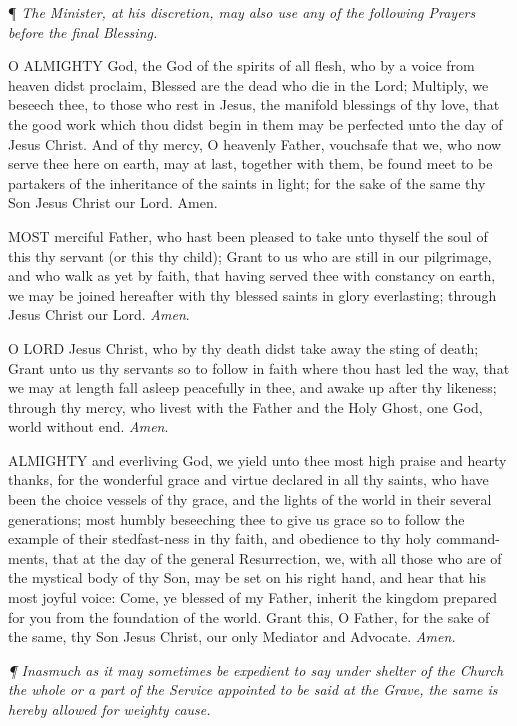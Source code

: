 ¶
\emph{The Minister, at his discretion, may also use any of the following
Prayers before the final Blessing.}

O
ALMIGHTY God, the God of the spirits of all flesh, who by a voice from
heaven didst proclaim, Blessed are the dead who die in the Lord; Multiply,
we beseech thee, to those who rest in Jesus, the manifold blessings of
thy love, that the good work which thou didst begin in them may be perfected
unto the day of Jesus Christ. And of thy mercy, O heavenly Father, vouchsafe
that we, who now serve thee here on earth, may at last, together with
them, be found meet to be partakers of the inheritance of the saints in
light; for the sake of the same thy Son Jesus Christ our Lord. Amen.

MOST
merciful Father, who hast been pleased to take unto thyself the soul of
this thy servant (or this thy child); Grant to us who are still in our
pilgrimage, and who walk as yet by faith, that having served thee with
constancy on earth, we may be joined hereafter with thy blessed saints
in glory everlasting; through Jesus Christ our Lord. \emph{Amen}.

O
LORD Jesus Christ, who by thy death didst take away the sting of death;
Grant unto us thy servants so to follow in faith where thou hast led the
way, that we may at length fall asleep peacefully in thee, and awake up
after thy likeness; through thy mercy, who livest with the Father and
the Holy Ghost, one God, world without end. \emph{Amen}.

ALMIGHTY
and everliving God, we yield unto thee most high praise and hearty thanks,
for the wonderful grace and virtue declared in all thy saints, who have
been the choice vessels of thy grace, and the lights of the world in their
several generations; most humbly beseeching thee to give us grace so to
follow the example of their stedfast-ness in thy faith, and obedience
to thy holy command-ments, that at the day of the general Resurrection,
we, with all those who are of the mystical body of thy Son, may be set
on his right hand, and hear that his most joyful voice: Come, ye blessed
of my Father, inherit the kingdom prepared for you from the foundation
of the world. Grant this, O Father, for the sake of the same, thy Son
Jesus Christ, our only Mediator and Advocate. \emph{Amen.}

\emph{¶
Inasmuch as it may sometimes be expedient to say under shelter of the
Church the whole or a part of the Service appointed to be said at the
Grave, the same is hereby allowed for weighty cause.}

